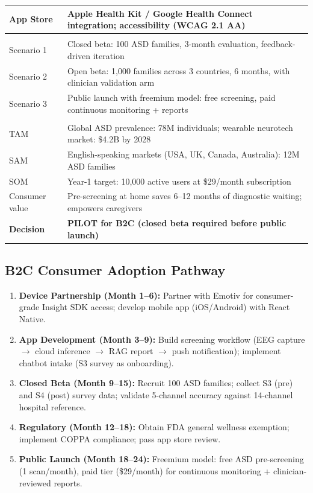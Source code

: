 {\begin{xltabular}{\textwidth}{@{} >{\raggedright\arraybackslash}p{2.5cm} L @{}}
App Store & Apple Health Kit / Google Health Connect integration; accessibility (WCAG 2.1 AA) \\
\midrule
{} \\
\addlinespace
Scenario 1 & Closed beta: 100 ASD families, 3-month evaluation, feedback-driven iteration \\
Scenario 2 & Open beta: 1,000 families across 3 countries, 6 months, with clinician validation arm \\
Scenario 3 & Public launch with freemium model: free screening, paid continuous monitoring + reports \\
\midrule
{} \\
\addlinespace
TAM & Global ASD prevalence: 78M individuals; wearable neurotech market: \$4.2B by 2028 \\
SAM & English-speaking markets (USA, UK, Canada, Australia): 12M ASD families \\
SOM & Year-1 target: 10,000 active users at \$29/month subscription \\
Consumer value & Pre-screening at home saves 6--12 months of diagnostic waiting; empowers caregivers \\
\midrule
\textbf{Decision} & \textbf{PILOT for B2C (closed beta required before public launch)} \\
\end{xltabular}}

\subsection{B2C Consumer Adoption Pathway}

\begin{enumerate}[label=\textbf{Stage \arabic*:}, leftmargin=2.5cm]
    \item \textbf{Device Partnership (Month 1--6):} Partner with Emotiv for consumer-grade Insight SDK access; develop mobile app (iOS/Android) with React Native.
    \item \textbf{App Development (Month 3--9):} Build screening workflow (EEG capture $\to$ cloud inference $\to$ RAG report $\to$ push notification); implement chatbot intake (S3 survey as onboarding).
    \item \textbf{Closed Beta (Month 9--15):} Recruit 100 ASD families; collect S3 (pre) and S4 (post) survey data; validate 5-channel accuracy against 14-channel hospital reference.
    \item \textbf{Regulatory (Month 12--18):} Obtain FDA general wellness exemption; implement COPPA compliance; pass app store review.
    \item \textbf{Public Launch (Month 18--24):} Freemium model: free ASD pre-screening (1 scan/month), paid tier (\$29/month) for continuous monitoring + clinician-reviewed reports.
\end{enumerate}

